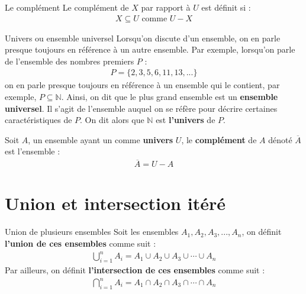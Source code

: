 \documentclass[8pt]{report}
\begin{document}
\begin{multicols*}{2}
\begin{Definitionx*}{Le complément}{}
    Le complément de $X$ par rapport à $U$ est définit si : 
    \begin{align*}
      X \subseteq U \text{ comme } U - X        
    \end{align*}
\end{Definitionx*}

\begin{Concept}{Univers ou ensemble universel}{}
    Lorsqu'on discute d'un ensemble, on en parle presque toujours en référence à un autre ensemble. Par exemple, 
    lorsqu'on parle de l'ensemble des nombres premiers $P$ :
    \begin{align*}
      P = \{ 2, 3, 5, 6, 11, 13, ... \} 
    \end{align*}
    on en parle presque toujours en référence à un ensemble qui le contient, par exemple, $P \subseteq \mathbb{N}$.
    Ainsi, on dit que le plus grand ensemble est un \textbf{ensemble universel}. Il s'agit de l'ensemble auquel 
    on se réfère pour décrire certaines caractéristiques de $P$. On dit alors que $\mathbb{N}$ est 
    \textbf{l'univers} de $P$.
\end{Concept}

\begin{Definitionx*}{}{}
  Soit $A$, un ensemble ayant un comme \textbf{univers} $U$, le \textbf{complément} de $A$ dénoté $\overline{A}$ 
  est l'ensemble :
  \begin{align*}
    \overline{A} = U - A 
  \end{align*}
\end{Definitionx*}

\section{Union et intersection itéré}
\begin{Syntaxe}{Union de plusieurs ensembles}{}
  Soit les ensembles $A_1, A_2, A_3,..., A_n$, on définit \textbf{l'union de ces ensembles} comme suit : 
    \begin{align*}
      \bigcup_{i=1}^n A_i = A_1\cup A_2 \cup A_3 \cup \cdots \cup A_n 
    \end{align*}
  Par ailleurs, on définit \textbf{l'intersection de ces ensembles} comme suit :
  \begin{align*}
      \bigcap_{i=1}^n A_i = A_1\cap A_2 \cap A_3 \cap \cdots \cap A_n 
  \end{align*}
\end{Syntaxe}


\end{multicols*}
\end{document}
